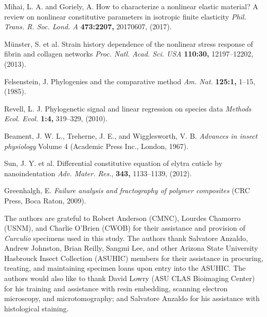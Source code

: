 \documentclass[twocolumn, linenumbers, superscriptaddress, nofootinbib]{revtex4-1}
\begin{document}
\begin{thebibliography}{50}
				Mihai, L. A. and Goriely, A.
				How to characterize a nonlinear elastic material? A review on nonlinear constitutive parameters in isotropic finite elasticity
				\textit{Phil. Trans. R. Soc. Lond. A}
				\textbf{473:2207,}
				20170607,
				(2017).
			
				M{\"u}nster, S. et al.
				Strain history dependence of the nonlinear stress response of fibrin and collagen networks
				\textit{Proc. Natl. Acad. Sci. USA}
				\textbf{110:30,}
				12197--12202,
				(2013).
			
				Felsenstein, J.
				Phylogenies and the comparative method
				\textit{Am. Nat.}
				\textbf{125:1,}
				1--15,
				(1985).
			
				Revell, L. J.
				Phylogenetic signal and linear regression on species data
				\textit{Methods Ecol. Evol.}
				\textbf{1:4,}
				319--329,
				(2010).
			
				Beament, J. W. L., Treherne, J. E., and Wigglesworth, V. B.
				\textit{Advances in insect physiology}
				Volume 4
				(Academic Press Inc.,
				London,
				1967).
			
				Sun, J. Y. et al.
				Differential constitutive equation of elytra cuticle by nanoindentation
				\textit{Adv. Mater. Res.},
				\textbf{343,}
				1133--1139,
				(2012).
			
				Greenhalgh, E.
				\textit{Failure analysis and fractography of polymer composites}
				(CRC Press,
				Boca Raton,
				2009).
	\end{thebibliography}

	\begin{acknowledgements}
		The authors are grateful to Robert Anderson (CMNC), Lourdes Chamorro (USNM), and Charlie O'Brien (CWOB) for their assistance and provision of \textit{Curculio} specimens used in this study.
		The authors thank Salvatore Anzaldo, Andrew Johnston, Brian Reilly, Sangmi Lee, and other Arizona State University Hasbrouck Insect Collection (ASUHIC) members for their assistance in procuring, treating, and maintaining specimen loans upon entry into the ASUHIC.
		The authors would also like to thank David Lowry (ASU CLAS Bioimaging Center) for his training and assistance with resin embedding, scanning electron microscopy, and microtomography; and Salvatore Anzaldo for his assistance with histological staining.
	\end{acknowledgements}
\end{document}
